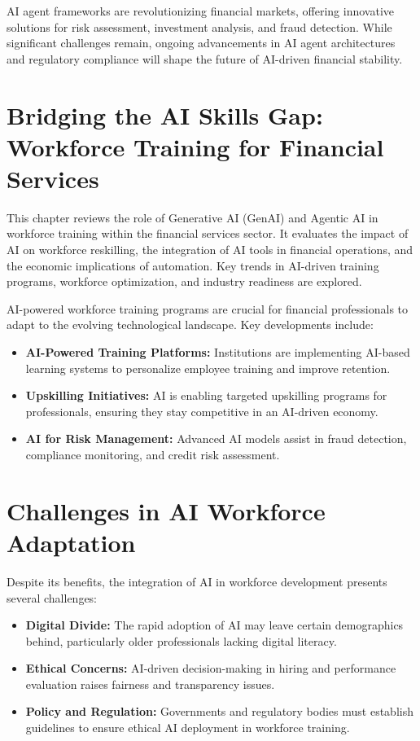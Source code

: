 \documentclass[a4paper,headinclude=on,footinclude=on,12pt,oneside]{scrbook}
\begin{document}
AI agent frameworks are revolutionizing financial markets, offering innovative solutions for risk assessment, investment analysis, and fraud detection. While significant challenges remain, ongoing advancements in AI agent architectures and regulatory compliance will shape the future of AI-driven financial stability.


\section{Bridging the AI Skills Gap: Workforce Training for Financial Services}


This chapter reviews the role of Generative AI (GenAI) and Agentic AI in workforce training within the financial services sector. It evaluates the impact of AI on workforce reskilling, the integration of AI tools in financial operations, and the economic implications of automation. Key trends in AI-driven training programs, workforce optimization, and industry readiness are explored.






AI-powered workforce training programs are crucial for financial professionals to adapt to the evolving technological landscape. Key developments include:
\begin{itemize}
	\item \textbf{AI-Powered Training Platforms:} Institutions are implementing AI-based learning systems to personalize employee training and improve retention.
	\item \textbf{Upskilling Initiatives:} AI is enabling targeted upskilling programs for professionals, ensuring they stay competitive in an AI-driven economy.
	\item \textbf{AI for Risk Management:} Advanced AI models assist in fraud detection, compliance monitoring, and credit risk assessment.
\end{itemize}

\section{Challenges in AI Workforce Adaptation}

Despite its benefits, the integration of AI in workforce development presents several challenges:
\begin{itemize}
	\item \textbf{Digital Divide:} The rapid adoption of AI may leave certain demographics behind, particularly older professionals lacking digital literacy.
	\item \textbf{Ethical Concerns:} AI-driven decision-making in hiring and performance evaluation raises fairness and transparency issues.
	\item \textbf{Policy and Regulation:} Governments and regulatory bodies must establish guidelines to ensure ethical AI deployment in workforce training.
\end{itemize}
\end{document}
